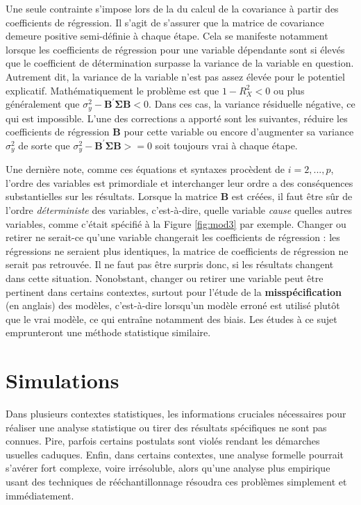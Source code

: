 \documentclass[
]{book}
\begin{document}
Une seule contrainte s'impose lors de la du calcul de la covariance à partir des coefficients de régression. Il s'agit de s'assurer que la matrice de covariance demeure positive semi-définie à chaque étape. Cela se manifeste notamment lorsque les coefficients de régression pour une variable dépendante sont si élevés que le coefficient de détermination surpasse la variance de la variable en question. Autrement dit, la variance de la variable n'est pas assez élevée pour le potentiel explicatif. Mathématiquement le problème est que \(1-R^2_X < 0\) ou plus généralement que \(\sigma^2_y-\mathbf{B^\prime\Sigma B}<0\). Dans ces cas, la variance résiduelle négative, ce qui est impossible. L'une des corrections a apporté sont les suivantes, réduire les coefficients de régression \(\mathbf{B}\) pour cette variable ou encore d'augmenter sa variance \(\sigma^2_y\) de sorte que \(\sigma^2_y-\mathbf{B^\prime\Sigma B}>=0\) soit toujours vrai à chaque étape.

Une dernière note, comme ces équations et syntaxes procèdent de \(i=2,...,p\), l'ordre des variables est primordiale et interchanger leur ordre a des conséquences substantielles sur les résultats. Lorsque la matrice \(\mathbf{B}\) est créées, il faut être sûr de l'ordre \emph{déterministe} des variables, c'est-à-dire, quelle variable \emph{cause} quelles autres variables, comme c'était spécifié à la Figure \ref{fig:mod3} par exemple. Changer ou retirer ne serait-ce qu'une variable changerait les coefficients de régression : les régressions ne seraient plus identiques, la matrice de coefficients de régression ne serait pas retrouvée. Il ne faut pas être surpris donc, si les résultats changent dans cette situation. Nonobstant, changer ou retirer une variable peut être pertinent dans certains contextes, surtout pour l'étude de la \textbf{misspécification} (en anglais) des modèles, c'est-à-dire lorsqu'un modèle erroné est utilisé plutôt que le vrai modèle, ce qui entraîne notamment des biais. Les études à ce sujet emprunteront une méthode statistique similaire.

\hypertarget{simulations}{%
\chapter{Simulations}\label{simulations}}

Dans plusieurs contextes statistiques, les informations cruciales nécessaires pour réaliser une analyse statistique ou tirer des résultats spécifiques ne sont pas connues. Pire, parfois certains postulats sont violés rendant les démarches usuelles caduques. Enfin, dans certains contextes, une analyse formelle pourrait s'avérer fort complexe, voire irrésoluble, alors qu'une analyse plus empirique usant des techniques de rééchantillonnage résoudra ces problèmes simplement et immédiatement.
\end{document}
